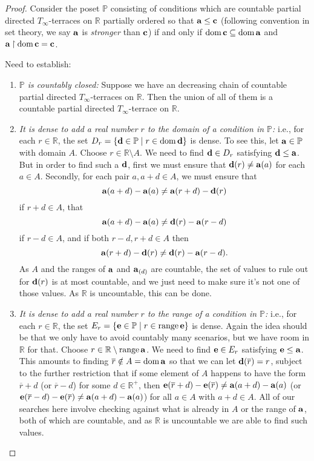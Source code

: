 \documentclass{amsart}
\theoremstyle{definition}
\theoremstyle{remark}
\renewcommand{\P}{\mathbb{P}}
\newcommand{\R}{\mathbb{R}}
\renewcommand{\c}{\mathfrak{c}}
\DeclareMathOperator{\ran}{range}
\DeclareMathOperator{\dom}{dom}
\newcommand{\st}{\; | \;}
\newcommand{\set}[2]{\left\{#1\st #2 \right\}}
\newcommand{\rest}{\mathbin{\upharpoonright}}
\renewcommand{\a}{\textup{\textbf{a}}}
\renewcommand{\c}{\textup{\textbf{c}}}
\renewcommand{\d}{\textup{\textbf{d}}}
\newcommand{\e}{\textup{\textbf{e}}}
\renewcommand{\r}{\overline r}
\begin{document}
\begin{proof}
Consider the poset $\P$ consisting of conditions which are countable partial directed $T_\infty$-terraces on $\R$ partially ordered so that $\a \leq \c$ (following convention in set theory, we say $\a$ is \emph{stronger} than $\c$) if and only if $\dom \c \subseteq \dom \a$ and $\a \rest \dom \c = \c$.

Need to establish: \begin{enumerate}
	\item \emph{$\P$ is countably closed:} Suppose we have an decreasing chain of countable partial directed $T_\infty$-terraces on $\R$. Then the union of all of them is a countable partial directed $T_\infty$-terrace on $\R$.
	\item \label{item:DomainDense} \emph{It is dense to add a real number $r$ to the domain of a condition in $\P$:} i.e., for each $r \in \R$, the set $D_r=\set{\d \in \P}{r \in \dom \d }$ is dense. To see this, let $\a \in \P$ with domain $A$. Choose $r \in \R \setminus A$. We need to find $\d \in D_r$ satisfying $\d \leq \a$. But in order to find such a $\d$, first we must ensure that $\d(r) \neq \a(a)$ for each $a \in A$. Secondly, for each pair $a, a+d \in A$, we must ensure that $$\a(a+d)-\a(a) \neq \a(r+d)-\d(r)$$ if $r+d \in A$, that $$\a(a+d)-\a(a) \neq \d(r)-\a(r-d)$$ if $r-d \in A$, and if both $r-d, r+d \in A$ then $$\a(r+d)-\d(r) \neq \d(r)-\a(r-d).$$ As $A$ and the ranges of $\a$ and $\a_{(d)}$ are countable, the set of values to rule out for $\d(r)$ is at most countable, and we just need to make sure it's not one of those values. As $\R$ is uncountable, this can be done.
	\item \emph{It is dense to add a real number $r$ to the range of a condition in $\P$:} i.e., for each $r \in \R$, the set $E_r=\set{\e \in \P}{r \in \ran \e }$ is dense. Again the idea should be that we only have to avoid countably many scenarios, but we have room in $\R$ for that. Choose $r \in \R \setminus \ran \a$. We need to find $\e \in E_r$ satisfying $\e \leq \a$. This amounts to finding $\r \notin A = \dom \a$ so that we can let $\d(\overline r)=r$, subject to the further restriction that if some element of $A$ happens to have the form $\r +d$ (or $\r-d$) for some $d \in \R^+$, then $\e(\r+d)-\e(\r) \neq \a(a+d)-\a(a)$ (or $\e(\r-d)-\e(\r) \neq \a(a+d)-\a(a)$) for all $a\in A$ with $a+d \in A$. All of our searches here involve checking against what is already in $A$ or the range of $\a$, both of which are countable, and as $\R$ is uncountable we are able to find such values.

\end{enumerate}
\end{proof}
\end{document}
